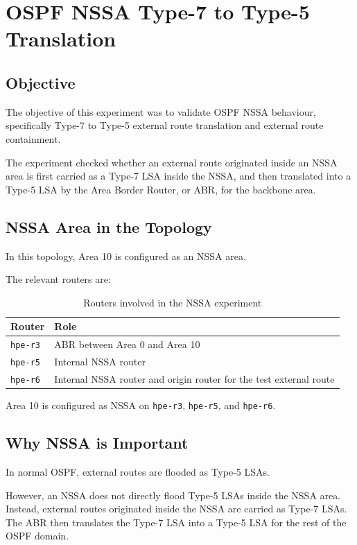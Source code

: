 \section{OSPF NSSA Type-7 to Type-5 Translation}

\subsection{Objective}

The objective of this experiment was to validate OSPF NSSA behaviour, specifically Type-7 to Type-5 external route translation and external route containment.

The experiment checked whether an external route originated inside an NSSA area is first carried as a Type-7 LSA inside the NSSA, and then translated into a Type-5 LSA by the Area Border Router, or ABR, for the backbone area.

\subsection{NSSA Area in the Topology}

In this topology, Area 10 is configured as an NSSA area.

The relevant routers are:

\begin{table}[h]
\centering
\begin{tabular}{|l|l|}
\hline
\textbf{Router} & \textbf{Role} \\
\hline
\texttt{hpe-r3} & ABR between Area 0 and Area 10 \\
\hline
\texttt{hpe-r5} & Internal NSSA router \\
\hline
\texttt{hpe-r6} & Internal NSSA router and origin router for the test external route \\
\hline
\end{tabular}
\caption{Routers involved in the NSSA experiment}
\end{table}

Area 10 is configured as NSSA on \texttt{hpe-r3}, \texttt{hpe-r5}, and \texttt{hpe-r6}.

\subsection{Why NSSA is Important}

In normal OSPF, external routes are flooded as Type-5 LSAs.

However, an NSSA does not directly flood Type-5 LSAs inside the NSSA area. Instead, external routes originated inside the NSSA are carried as Type-7 LSAs. The ABR then translates the Type-7 LSA into a Type-5 LSA for the rest of the OSPF domain.

